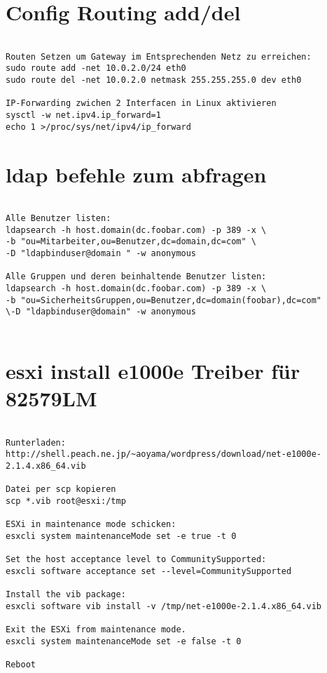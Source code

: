 \documentclass[a4paper,10pt]{report}
\begin{document}
\section{Config Routing add/del}
\begin{verbatim}
 
Routen Setzen um Gateway im Entsprechenden Netz zu erreichen:
sudo route add -net 10.0.2.0/24 eth0
sudo route del -net 10.0.2.0 netmask 255.255.255.0 dev eth0

IP-Forwarding zwichen 2 Interfacen in Linux aktivieren
sysctl -w net.ipv4.ip_forward=1
echo 1 >/proc/sys/net/ipv4/ip_forward

\end{verbatim}



\section{ldap befehle zum abfragen}
\begin{verbatim}
 
Alle Benutzer listen:
ldapsearch -h host.domain(dc.foobar.com) -p 389 -x \
-b "ou=Mitarbeiter,ou=Benutzer,dc=domain,dc=com" \
-D "ldapbinduser@domain	" -w anonymous

Alle Gruppen und deren beinhaltende Benutzer listen:
ldapsearch -h host.domain(dc.foobar.com) -p 389 -x \
-b "ou=SicherheitsGruppen,ou=Benutzer,dc=domain(foobar),dc=com" 
\-D "ldapbinduser@domain" -w anonymous


\end{verbatim}
\section{esxi install e1000e Treiber für 82579LM}
\begin{verbatim}
 
Runterladen:
http://shell.peach.ne.jp/~aoyama/wordpress/download/net-e1000e-2.1.4.x86_64.vib

Datei per scp kopieren
scp *.vib root@esxi:/tmp

ESXi in maintenance mode schicken:
esxcli system maintenanceMode set -e true -t 0

Set the host acceptance level to CommunitySupported:
esxcli software acceptance set --level=CommunitySupported

Install the vib package:
esxcli software vib install -v /tmp/net-e1000e-2.1.4.x86_64.vib

Exit the ESXi from maintenance mode.
esxcli system maintenanceMode set -e false -t 0

Reboot

\end{verbatim}
\end{document}
